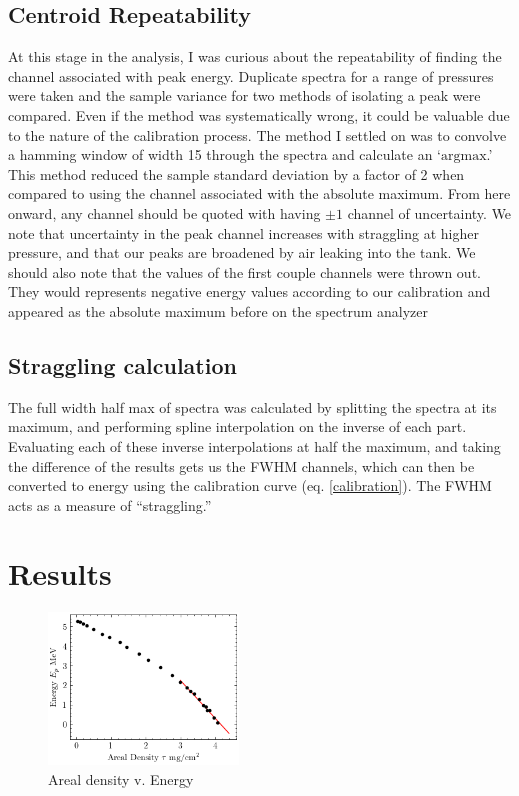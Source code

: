 \documentclass[12pt]{article}
\begin{document}
\begin{multicols}{2}
    \subsection{Centroid Repeatability}
    At this stage in the analysis, I was curious about the repeatability of finding the channel associated with peak energy. Duplicate spectra for a range of pressures were taken and the sample variance for two methods of isolating a peak were compared. Even if the method was systematically wrong, it could be valuable due to the nature of the calibration process. The method I settled on was to convolve a hamming window of width 15 through the spectra and calculate an `$\text{argmax}$.' This method reduced the sample standard deviation by a factor of 2 when compared to using the channel associated with the absolute maximum. From here onward, any channel should be quoted with having $\pm 1$ channel of uncertainty. We note that uncertainty in the peak channel increases with straggling at higher pressure, and that our peaks are broadened by air leaking into the tank. We should also note that the values of the first couple channels were thrown out. They would represents negative energy values according to our calibration and appeared as the absolute maximum before on the spectrum analyzer

    \subsection{Straggling calculation}
    The full width half max of spectra was calculated by splitting the spectra at its maximum, and performing spline interpolation on the inverse of each part. Evaluating each of these inverse interpolations at half the maximum, and taking the difference of the results gets us the FWHM channels, which can then be converted to energy using the calibration curve (eq. \ref{calibration}). The FWHM acts as a measure of ``straggling.''

    \section{Results}

    \begin{figure}[H]
        \includegraphics[width=0.45\textwidth]{charts/Energy.png}
        \caption{Areal density v. Energy}
        \label{energy}
    \end{figure}


\end{multicols}
\end{document}
